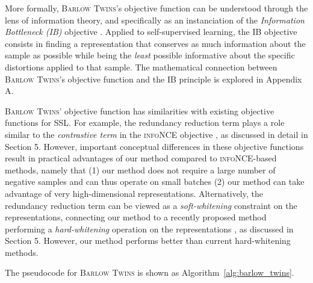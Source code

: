 \documentclass{article}
\newcommand{\AlgoName}{\textsc{Barlow Twins}}
\begin{document}
More formally, \AlgoName{}'s objective function can be understood through the lens of information theory, and specifically as an instanciation of the \emph{Information Bottleneck (IB)} objective \cite{tishby_deep_2015,tishby_information_2000}. Applied to self-supervised learning, the IB objective consists in finding a representation that conserves as much information about the sample as possible while being the \emph{least} possible informative about the specific distortions applied to that sample. The mathematical connection between \AlgoName{}'s objective function and the IB principle is explored in Appendix A.

\AlgoName{}' objective function has similarities with existing objective functions for SSL. For example, the redundancy reduction term plays a role similar to the \emph{contrastive term} in the \textsc{infoNCE} objective \cite{oord2018representation}, as discussed in detail in Section 5. However, important conceptual differences in these objective functions result in practical advantages of our method compared to \textsc{infoNCE}-based methods, namely that (1) our method does not require a large number of negative samples and can thus operate on small batches (2) our method can take advantage of very high-dimensional representations. Alternatively, the redundancy reduction term can be viewed as a \emph{soft-whitening} constraint on the representations, connecting our method to a recently proposed method performing a \emph{hard-whitening} operation on the representations \cite{ermolov_whitening_2020}, as discussed in Section 5. However, our method performs better than current hard-whitening methods.


The pseudocode for \AlgoName{} is shown as Algorithm~\ref{alg:barlow_twins}.
\end{document}
